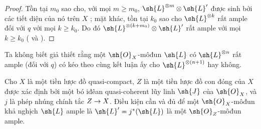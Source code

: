 \documentclass[oneside,10pt]{amsart}
\makeatletter
\renewcommand{\geq}{\geqslant}
\newcommand{\ega@arrow}[2]{\mathchoice{#1}{#2}{#2}{#2}}
\renewcommand{\to}{\ega@arrow{\longrightarrow}{\rightarrow}}
\let\EGAOriginalLabel\label
\renewcommand{\label}[1]{\phantomsection\EGAOriginalLabel{#1}}
\makeatother
\begin{document}
\begin{proof}
Tồn tại $m_0$ sao cho, với mọi $m\geq m_0$, $\sh{L}^{\otimes m}\otimes\sh{L}'$ được sinh bởi các tiết diện của nó trên $X$ ;
mặt khác, tồn tại $k_0$ sao cho $\sh{L}^{\otimes k}$ rất ample đối với $q$ với mọi $k\geq k_0$.
Do đó $\sh{L}^{\otimes(k+m_0)}\otimes\sh{L}'$ rất ample với mọi $k\geq k_0$ ( và ).
\end{proof}

\begin{remark}[4.5.12]
\label{II.4.5.12}
Ta không biết giả thiết rằng một $\sh{O}_X$-môđun $\sh{L}$ có $\sh{L}^{\otimes n}$ rất ample (đối với $q$) có kéo theo cùng kết luận ấy cho $\sh{L}^{\otimes(n+1)}$ hay không.
\end{remark}

\begin{proposition}[4.5.13]
\label{II.4.5.13}
Cho $X$ là một tiền lược đồ quasi-compact, $Z$ là một tiền lược đồ con đóng của $X$ được xác định bởi một bó iđêan quasi-coherent lũy linh $\sh{J}$ của $\sh{O}_X$, và $j$ là phép nhúng chính tắc $Z\to X$.
Điều kiện cần và đủ để một $\sh{O}_X$-môđun khả nghịch $\sh{L}$ ample là $\sh{L}'=j^*(\sh{L})$ là một $\sh{O}_Z$-môđun ample.
\end{proposition}
\end{document}
